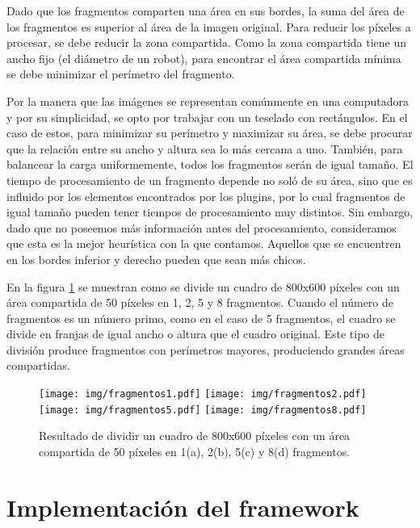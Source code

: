Dado que los fragmentos comparten una área en sus bordes, la suma del área de
los fragmentos es superior al área de la imagen original. Para reducir los
píxeles a procesar, se debe reducir la zona compartida. Como la zona compartida
tiene un ancho fijo (el diámetro de un robot), para encontrar el área compartida
mínima se debe minimizar el perímetro del fragmento.

Por la manera que las imágenes se representan comúnmente en una computadora y
por su simplicidad, se opto por trabajar con un teselado con rectángulos. En el
caso de estos, para minimizar su perímetro y maximizar su área, se debe procurar
que la relación entre su ancho y altura sea lo más cercana a uno. También, para
balancear la carga uniformemente, todos los fragmentos serán de igual tamaño.
El tiempo de procesamiento de un fragmento depende no soló de su área, sino que
es influido por los elementos encontrados por los plugins, por lo cual
fragmentos de igual tamaño pueden tener tiempos de procesamiento muy distintos.
Sin embargo, dado que no poseemos más información antes del procesamiento,
consideramos que esta es la mejor heurística con la que contamos. Aquellos que
se encuentren en los bordes inferior y derecho pueden que sean más chicos.

En la figura \ref{fragmentos} se muestran como se divide un cuadro de 800x600
píxeles con un área compartida de 50 píxeles en 1, 2, 5 y 8 fragmentos. Cuando
el número de fragmentos es un número primo, como en el caso de 5 fragmentos, el
cuadro se divide en franjas de igual ancho o altura que el cuadro original. Este
tipo de división produce fragmentos con perímetros mayores, produciendo grandes
áreas compartidas.

\begin{figure}[h]

	\texttt{[image: img/fragmentos1.pdf]}
	\texttt{[image: img/fragmentos2.pdf]}
	\texttt{[image: img/fragmentos5.pdf]}
	\texttt{[image: img/fragmentos8.pdf]}
	\caption{Resultado de dividir un cuadro de 800x600 píxeles con un área
	compartida de 50 píxeles en 1(a), 2(b), 5(c) y 8(d) fragmentos.}
	\label{fragmentos}

\end{figure}

\section{Implementación del framework}

